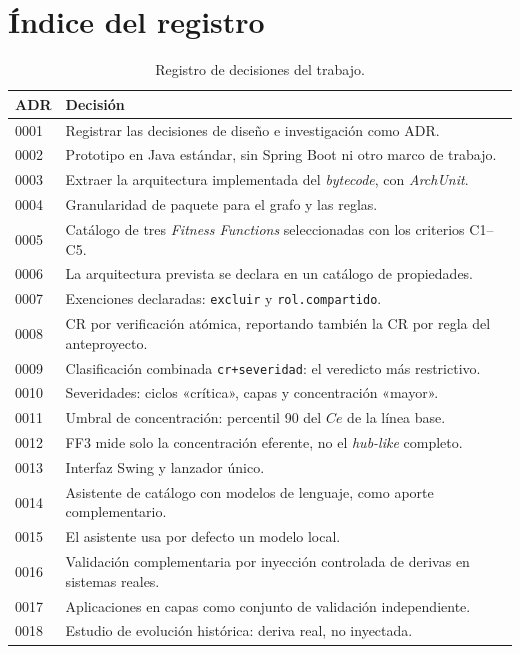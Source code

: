 \section{Índice del registro}
\begin{table}[H]
\centering
\caption{Registro de decisiones del trabajo.}
\label{tab:adr}
\footnotesize
\begin{tabularx}{\textwidth}{lX}
\toprule
\textbf{ADR} & \textbf{Decisión} \\
\midrule
0001 & Registrar las decisiones de diseño e investigación como ADR. \\
0002 & Prototipo en Java estándar, sin Spring Boot ni otro marco de trabajo. \\
0003 & Extraer la arquitectura implementada del \textit{bytecode}, con \textit{ArchUnit}. \\
0004 & Granularidad de paquete para el grafo y las reglas. \\
0005 & Catálogo de tres \textit{Fitness Functions} seleccionadas con los criterios C1--C5. \\
0006 & La arquitectura prevista se declara en un catálogo de propiedades. \\
0007 & Exenciones declaradas: \texttt{excluir} y \texttt{rol.compartido}. \\
0008 & CR por verificación atómica, reportando también la CR por regla del anteproyecto. \\
0009 & Clasificación combinada \texttt{cr+severidad}: el veredicto más restrictivo. \\
0010 & Severidades: ciclos «crítica», capas y concentración «mayor». \\
0011 & Umbral de concentración: percentil 90 del $Ce$ de la línea base. \\
0012 & FF3 mide solo la concentración eferente, no el \textit{hub-like} completo. \\
0013 & Interfaz Swing y lanzador único. \\
0014 & Asistente de catálogo con modelos de lenguaje, como aporte complementario. \\
0015 & El asistente usa por defecto un modelo local. \\
0016 & Validación complementaria por inyección controlada de derivas en sistemas reales. \\
0017 & Aplicaciones en capas como conjunto de validación independiente. \\
0018 & Estudio de evolución histórica: deriva real, no inyectada. \\

\end{tabularx}
\end{table}
